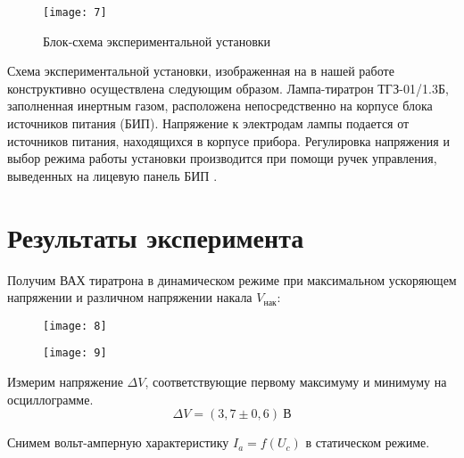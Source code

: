 \documentclass[a4paper, 12pt]{article}
\begin{document}
\begin{figure}[H]
    \texttt{[image: 7]} 
    \caption{Блок-схема экспериментальной установки}
    \label{fig:7}
\end{figure}

Схема экспериментальной установки, изображенная на  в нашей
работе конструктивно осуществлена следующим образом. Лампа-тиратрон
ТГЗ-01/1.3Б, заполненная инертным газом, расположена непосредственно
на корпусе блока источников питания (БИП). Напряжение к электродам
лампы подается от источников питания, находящихся в корпусе прибора.
Регулировка напряжения и выбор режима работы установки производится
при помощи ручек управления, выведенных на лицевую панель БИП
.


\section{Результаты эксперимента}
Получим ВАХ тиратрона в динамическом режиме при максимальном
ускоряющем напряжении и различном напряжении накала $V_\text{нак}$:


\begin{figure}[H]
    \begin{floatrow}

        {
        \texttt{[image: 8]}
        \label{fig:8}
    }

        {
        \texttt{[image: 9]}
        \label{fig:9}
    }
    \end{floatrow}
\end{figure}

Измерим напряжение $\Delta V$, соответствующие первому максимуму и
минимуму на осциллограмме.
\[
    \Delta V = (3,7 \pm 0,6)\: \text{В}
\]

Снимем вольт-амперную характеристику $I_a = f(U_c)$ в статическом
режиме.
\end{document}
